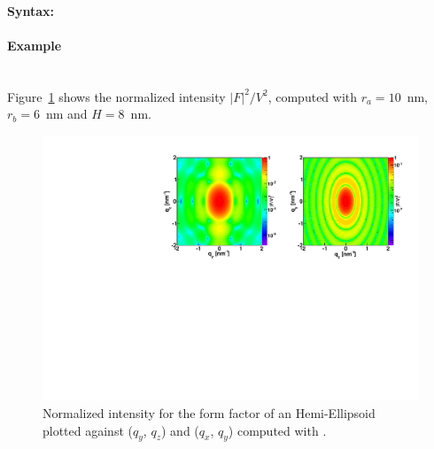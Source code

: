 \paragraph{Syntax:} 

\newpage

\paragraph{Example} \mbox{}\\
Figure~\ref{fig:FFhemiellipsEx} shows the normalized intensity
$|F|^2/V^2$, computed with $r_a=10$~nm, $r_b=6$~nm and $H=8$~nm.

\begin{figure}[h]
\begin{center}
\includegraphics[width=\textwidth]{Figures/figffhemiellips}
\end{center}
\caption{Normalized intensity for the form factor of an Hemi-Ellipsoid plotted against ($q_y$, $q_z$) and  ($q_x$, $q_y$)
  computed with .}
\label{fig:FFhemiellipsEx}
\end{figure}


\newpage%
